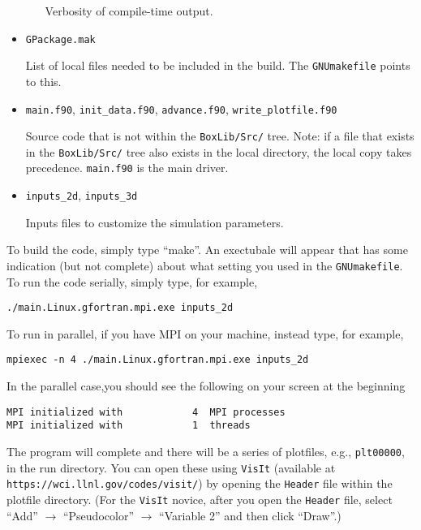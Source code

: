 \begin{itemize}
\begin{itemize}
    Verbosity of compile-time output.

  \end{itemize}

\item {\tt GPackage.mak}

List of local files needed to be included in the build.  The {\tt GNUmakefile} points to this.

\item {\tt main.f90}, {\tt init\_data.f90}, {\tt advance.f90}, {\tt write\_plotfile.f90}

Source code that is not within the {\tt BoxLib/Src/} tree.  Note: if a file that exists in the
{\tt BoxLib/Src/} tree also exists in the local directory, the local copy takes precedence.
{\tt main.f90} is the main driver.

\item {\tt inputs\_2d}, {\tt inputs\_3d}

Inputs files to customize the simulation parameters.

\end{itemize}

To build the code, simply type ``make''.  An exectubale will appear that has some indication (but not complete)
about what setting you used in the {\tt GNUmakefile}.  To run the code serially, simply type, for example,
\begin{lstlisting}[language={[gnu]make},mathescape=false]
./main.Linux.gfortran.mpi.exe inputs_2d
\end{lstlisting}
To run in parallel, if you have MPI on your machine, instead type, for example,
\begin{lstlisting}[language={[gnu]make},mathescape=false]
mpiexec -n 4 ./main.Linux.gfortran.mpi.exe inputs_2d
\end{lstlisting}
In the parallel case,you should see the following on your screen at the beginning
\begin{lstlisting}[language={[gnu]make},mathescape=false]
MPI initialized with            4  MPI processes
MPI initialized with            1  threads
\end{lstlisting}
The program will complete and there will be a series of plotfiles, e.g., {\tt plt00000}, in the run directory.
You can open these using {\tt VisIt} (available at {\tt https://wci.llnl.gov/codes/visit/}) by opening
the {\tt Header} file within the plotfile directory.  (For the {\tt VisIt} novice, after you open the {\tt Header}
file, select ``Add'' $\rightarrow$ ``Pseudocolor'' $\rightarrow$ ``Variable 2'' and then click ``Draw''.)

